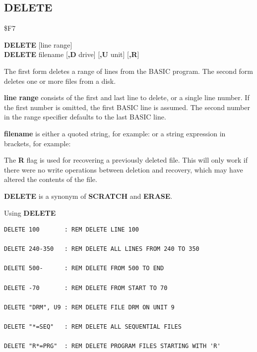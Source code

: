 \subsection{DELETE}
\begin{description}[leftmargin=2cm,style=nextline]
\item [Token:]   \$F7

\item [Format:]  {\bf DELETE} [line range] \\
                 {\bf DELETE} filename [{\bf,D} drive] [{\bf,U} unit] [{\bf,R}]

\item [Usage:]   The first form deletes a range of lines from the BASIC program. The second form deletes one or more files from a disk.

                 {\bf line range} consists of the first and last line to delete, or a single line number. If the first number is omitted, the first BASIC line is assumed. The second number in the range specifier defaults to the last BASIC line.

                 {\bf filename} is either a quoted string, for example:  or a string expression in brackets, for example: 

                 \drivedefinition

                 \unitdefinition

                 The {\bf R} flag is used for recovering a previously deleted file. This will only work if there were no write operations between deletion and recovery, which may have altered the contents of the file.

\item [Remarks:] {\bf DELETE} is a synonym of {\bf SCRATCH} and {\bf ERASE}.

\item [Examples:] Using {\bf DELETE}

\begin{tcolorbox}[colback=black,coltext=white]
\verbatimfont{\codefont}
\begin{verbatim}
DELETE 100       : REM DELETE LINE 100

DELETE 240-350   : REM DELETE ALL LINES FROM 240 TO 350

DELETE 500-      : REM DELETE FROM 500 TO END

DELETE -70       : REM DELETE FROM START TO 70

DELETE "DRM", U9 : REM DELETE FILE DRM ON UNIT 9

DELETE "*=SEQ"   : REM DELETE ALL SEQUENTIAL FILES

DELETE "R*=PRG"  : REM DELETE PROGRAM FILES STARTING WITH 'R'
\end{verbatim}
\end{tcolorbox}
\end{description}


